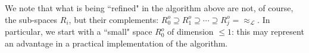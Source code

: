 \documentclass[3p]{elsarticle}
\newcommand{\fL}{\mathcal{L}}    %
\newcommand{\dimn}{\mathrm{dim}}   %
\newcommand{\ann}{o}                    %
\newcommand{\kernel}{\mathrm{ker}} %
\newcommand{\R}{R}%
\newcommand{\mik}[1]{\marginpar{ \textbf{MiB:} {\footnotesize #1}}} %
\newcommand{\reals}{{\mathbb{R}}}              %
\begin{document}

We note that what is being ``refined" in the algorithm above are
not, of course, the sub-spaces $R_i$, but their   complements:
$R^\ann_0\supseteq R^\ann_1\supseteq \cdots  \supseteq
R^\ann_j=\approx_\fL$. In particular, we start with a ``small" space
$R^\ann_0$ of dimension $\leq 1$: this may represent an advantage in
a practical implementation of the algorithm.
\end{document}
